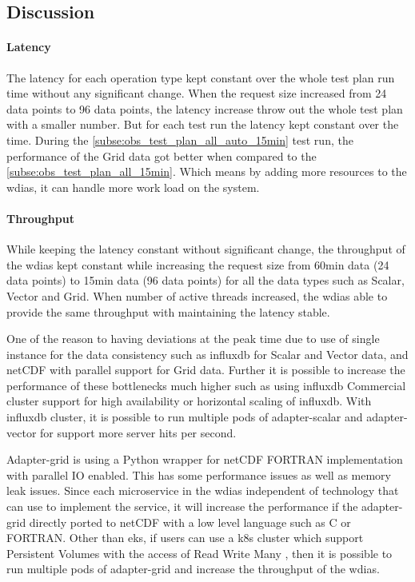 \documentclass[conference]{IEEEtran}
\begin{document}
\subsection{Discussion}
\paragraph{Latency}
The latency for each operation type kept constant over the whole test plan run time without any significant change. When the request size increased from 24 data points to 96 data points, the latency increase throw out the whole test plan with a smaller number. But for each test run the latency kept constant over the time.
During the \ref{subse:obs_test_plan_all_auto_15min} test run, the performance of the Grid data got better when compared to the \ref{subse:obs_test_plan_all_15min}. Which means by adding more resources to the \acrshort{wdias}, it can handle more work load on the system.

\paragraph{Throughput}
While keeping the latency constant without significant change, the throughput of the \acrshort{wdias} kept constant while increasing the request size from 60min data (24 data points) to 15min data (96 data points) for all the data types such as Scalar, Vector and Grid.
When number of active threads increased, the \acrshort{wdias} able to provide the same throughput with maintaining the latency stable.

One of the reason to having deviations at the peak time due to use of single instance for the data consistency such as \acrshort{influxdb} for Scalar and Vector data, and netCDF with parallel support for Grid data. Further it is possible to increase the performance of these bottlenecks much higher such as using \acrshort{influxdb} Commercial cluster support for high availability or horizontal scaling of \acrshort{influxdb}. With \acrshort{influxdb} cluster, it is possible to run multiple pods of adapter-scalar and adapter-vector for support more server hits per second.

Adapter-grid is using a Python wrapper for netCDF FORTRAN implementation with parallel IO enabled. This has some performance issues as well as memory leak issues. Since each microservice in the \acrshort{wdias} independent of technology that can use to implement the service, it will increase the performance if the adapter-grid directly ported to netCDF with a low level language such as C or FORTRAN.
Other than \acrshort{eks}, if users can use a \acrshort{k8s} cluster which support Persistent Volumes with the access of Read Write  Many \cite{LinuxFoundationPersistentKubernetes} , then it is possible to run multiple pods of adapter-grid and increase the throughput of the \acrshort{wdias}.
\end{document}
